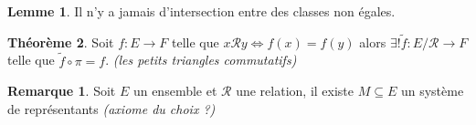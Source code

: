 \documentclass{report}
\theoremstyle{definition}
\newtheorem{theorem}{Théorème}[section]
\newtheorem{lemma}[theorem]{Lemme}
\newtheorem*{rk}{Remarque}
\begin{document}
\begin{lemma}
    Il n'y a jamais d'intersection entre des classes non égales.
\end{lemma}

\begin{theorem}
    Soit \(f : E\to F\) telle que \(x\mathcal{R}y \Leftrightarrow f(x)=f(y)\) alors
    \(\exists ! \tilde{f} : E/\mathcal{R} \to F\) telle que \(\tilde{f}\circ \pi = f\).
    \textit{(les petits triangles commutatifs)}
\end{theorem}

\begin{rk}
    Soit \(E\) un ensemble et \(\mathcal{R}\) une relation, il
    existe \(M\subseteq E\) un système de représentants \textit{(axiome du choix ?)}
\end{rk}
\end{document}
